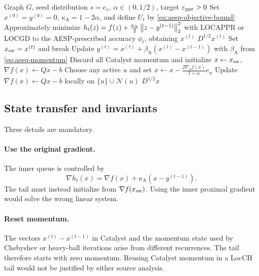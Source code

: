 \begin{algorithm}[t]
\caption{Proof-oriented hybrid AESP--LocSOR}
\label{alg:hybrid-aesp-locsor}
\begin{algorithmic}[1]
\REQUIRE Graph \(G\), seed distribution \(s=e_v\),
         \(\alpha\in(0,1/2)\), target \(\varepsilon_{\mathrm{ppr}}>0\)
\STATE Set \(x^{(0)}=y^{(0)}=0\), \(\kappa_{\mathrm A}=1-2\alpha\), and define \(U_t\) by
       \cref{eq:aesp-objective-bound}
    \STATE Approximately minimize
    \(
       h_t(z)=f(z)+\frac{\kappa_{\mathrm A}}{2}\left\lVert z-y^{(t-1)}\right\rVert_2^2
    \)
    with LOCAPPR or LOCGD to the AESP-prescribed accuracy \(\phi_t\), obtaining
    \(x^{(t)}\)
        \RETURN \(D^{1/2}x^{(t)}\)
    \ENDIF
        \STATE Set \(x_{\rm sw}=x^{(t)}\) and break
    \ENDIF
    \STATE Update
    \(
       y^{(t)}=x^{(t)}+\beta_{\mathrm A}(x^{(t)}-x^{(t-1)})
    \)
    with \(\beta_{\mathrm A}\) from \cref{eq:aesp-momentum}
\ENDFOR
\STATE Discard all Catalyst momentum and initialize
       \(x\leftarrow x_{\rm sw}\), \(\nabla f(x)\leftarrow Qx-b\)
    \STATE Choose any active \(u\) and set
    \(
       x\leftarrow x-\frac{2\nabla_u f(x)}{1+\alpha}e_u
    \)
    \STATE Update \(\nabla f(x)\leftarrow Qx-b\) locally on
          \(\{u\}\cup\mathcal N(u)\)
\ENDWHILE
\RETURN \(D^{1/2}x\)
\end{algorithmic}
\end{algorithm}

\subsection{State transfer and invariants}

Three details are mandatory.

\paragraph{Use the original gradient.}
The inner queue is controlled by
\begin{equation}
    \nabla h_t(x)
    =\nabla f(x)+\kappa_{\mathrm A}(x-y^{(t-1)}).
    \label{eq:inner-vs-original-gradient}
\end{equation}
The tail must instead initialize from \(\nabla f(x_{\rm sw})\).  Using the inner
proximal gradient would solve the wrong linear system.

\paragraph{Reset momentum.}
The vectors \(x^{(t)}-x^{(t-1)}\) in Catalyst and the momentum state used by
Chebyshev or heavy-ball iterations arise from different recurrences.  The
tail therefore starts with zero momentum.  Reusing Catalyst momentum in a
LocCH tail would not be justified by either source analysis.

